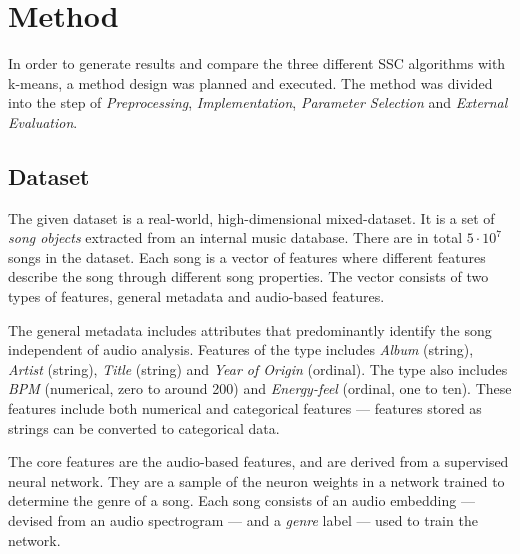 \documentclass[../report.tex]{subfiles}
\begin{document}
\chapter{Method}
In order to generate results and compare the three different SSC algorithms with k-means, a method design was planned and executed. The method was divided into the step of \textit{Preprocessing}, \textit{Implementation}, \textit{Parameter Selection} and \textit{External Evaluation}.

\section{Dataset}
\label{sec:dataset}
The given dataset is a real-world, high-dimensional mixed-dataset. It is a set of \textit{song objects} extracted from an internal music database. There are in total $5\cdot10^7$ songs in the dataset. Each song is a vector of features where different features describe the song through different song properties. The vector consists of two types of features, general metadata and audio-based features.

The general metadata includes attributes that predominantly identify the song independent of audio analysis. Features of the type includes \textit{Album} (string), \textit{Artist} (string), \textit{Title} (string) and \textit{Year of Origin} (ordinal). The type also includes \textit{BPM} (numerical, zero to around 200) and \textit{Energy-feel} (ordinal, one to ten). These features include both numerical and categorical features --- features stored as strings can be converted to categorical data.

The core features are the audio-based features, and are derived from a supervised neural network. They are a sample of the neuron weights in a network trained to determine the genre of a song. Each song consists of an audio embedding --- devised from an audio spectrogram --- and a \textit{genre} label --- used to train the network.
\end{document}
